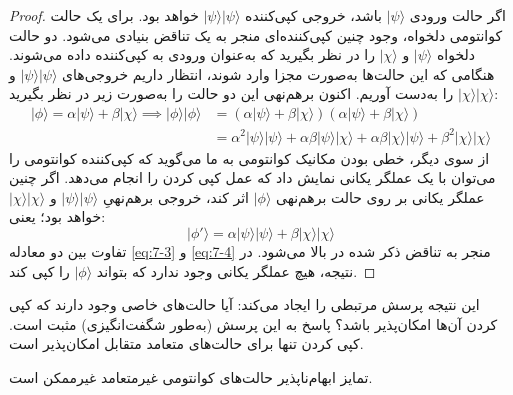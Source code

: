 \begin{proof}
	اگر حالت ورودی $|\psi\rangle$ باشد، خروجی کپی‌کننده $|\psi\rangle|\psi\rangle$ خواهد بود. برای یک حالت کوانتومی دلخواه، وجود چنین کپی‌کننده‌ای منجر به یک تناقض بنیادی می‌شود.
	دو حالت دلخواه $|\psi\rangle$ و $|\chi\rangle$ را در نظر بگیرید که به‌عنوان ورودی به کپی‌کننده داده می‌شوند. هنگامی که این حالت‌ها به‌صورت مجزا وارد شوند، انتظار داریم خروجی‌های $|\psi\rangle|\psi\rangle$ و $|\chi\rangle|\chi\rangle$ را به‌دست آوریم. اکنون برهم‌نهی این دو حالت را به‌صورت زیر در نظر بگیرید:
	\begin{equation}
		\begin{aligned}
			|\phi\rangle = \alpha |\psi\rangle + \beta |\chi\rangle \implies |\phi\rangle |\phi\rangle &= (\alpha |\psi\rangle + \beta |\chi\rangle)(\alpha |\psi\rangle + \beta |\chi\rangle) \\
			&= \alpha^2 |\psi\rangle |\psi\rangle + \alpha\beta |\psi\rangle |\chi\rangle + \alpha\beta |\chi\rangle |\psi\rangle + \beta^2 |\chi\rangle |\chi\rangle
		\end{aligned}
		\label{eq:7-3}
	\end{equation}
	از سوی دیگر، خطی بودن مکانیک کوانتومی به ما می‌گوید که کپی‌کننده کوانتومی را می‌توان با یک عملگر یکانی نمایش داد که عمل کپی کردن را انجام می‌دهد. اگر چنین عملگر یکانی بر روی حالت برهم‌نهی $|\phi\rangle$ اثر کند، خروجی برهم‌نهیِ $|\psi\rangle|\psi\rangle$ و $|\chi\rangle|\chi\rangle$ خواهد بود؛ یعنی:
	\begin{equation}
		|\phi'\rangle = \alpha |\psi\rangle |\psi\rangle + \beta |\chi\rangle |\chi\rangle
		\label{eq:7-4}
	\end{equation}
	تفاوت بین دو معادله \eqref{eq:7-3} و \eqref{eq:7-4} منجر به تناقض ذکر شده در بالا می‌شود. در نتیجه، هیچ عملگر یکانی وجود ندارد که بتواند $|\phi\rangle$ را کپی کند.
\end{proof}

این نتیجه پرسش مرتبطی را ایجاد می‌کند: آیا حالت‌های خاصی وجود دارند که کپی کردن آن‌ها امکان‌پذیر باشد؟ پاسخ به این پرسش (به‌طور شگفت‌انگیزی) مثبت است. کپی کردن تنها برای حالت‌های متعامد متقابل امکان‌پذیر است.







\begin{theorem}
	\label{thm:7-2}
	تمایز ابهام‌ناپذیر حالت‌های کوانتومی غیرمتعامد غیرممکن است.
\end{theorem}

